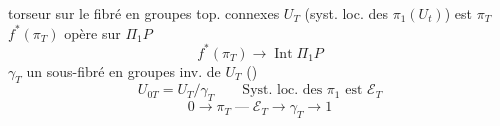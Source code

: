  torseur sur le fibré
en groupes
top. connexes $U_T$
(syst. loc. des $\pi_1(U_t)$) est $\pi_T$
$f^*(\pi_T)$  opère sur \deleted{\unsure{$\pi$}} $\Pi_1P$
\[
f^*(\pi_T)\longrightarrow\operatorname{Int}\Pi_1P
\]
$\gamma_T$ un sous-fibré en groupes inv. de $U_T$
()
\[
U_{0T}=U_T/\gamma_T
\qquad \text{Syst. loc. des }\pi_1\text{ est }\mathcal E_T
\]
\[
0\longrightarrow\pi_T\mathbin{\text{---}}\mathcal E_T
\longrightarrow\gamma_T\longrightarrow1
\]

